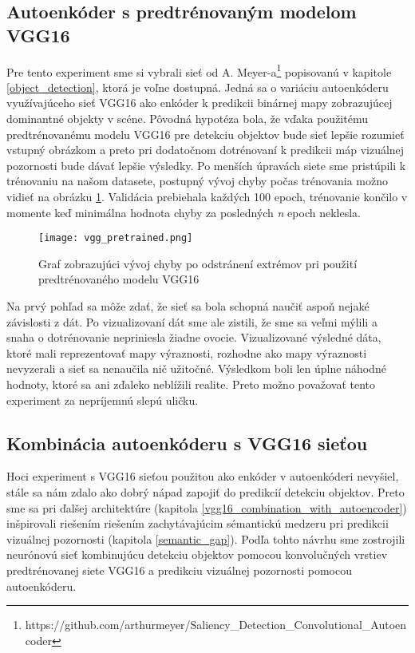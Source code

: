 \subsection{Autoenkóder s predtrénovaným modelom VGG16}
\label{experiments_vgg_net}

Pre tento experiment sme si vybrali sieť od A. Meyer-a\footnote{https://github.com/arthurmeyer/Saliency\_Detection\_Convolutional\_Autoencoder} popisovanú v kapitole \ref{object_detection}, ktorá je voľne dostupná. Jedná sa o variáciu autoenkóderu využívajúceho sieť VGG16 ako enkóder k predikcii binárnej mapy zobrazujúcej dominantné objekty v scéne. Pôvodná hypotéza bola, že vďaka použitému predtrénovanému modelu VGG16 pre detekciu objektov bude sieť lepšie rozumieť vstupný obrázkom a preto pri dodatočnom dotrénovaní k predikcii máp vizuálnej pozornosti bude dávať lepšie výsledky. Po menších úpravách siete sme pristúpili k trénovaniu na našom datasete, postupný vývoj chyby počas trénovania možno vidieť na obrázku \ref{vgg_pretrained_loss}. Validácia prebiehala každých 100 epoch, trénovanie končilo v momente keď minimálna hodnota chyby za posledných \textit{n} epoch neklesla. 
 
\begin{figure}[H]
	\begin{center}
		\texttt{[image: vgg\_pretrained.png]}
		\caption[Vývoj chyby počas trénovanie siete s predtrénovaným modelom VGG16]{
			Graf zobrazujúci vývoj chyby po odstránení extrémov pri použití predtrénovaného modelu VGG16 
		}\label{vgg_pretrained_loss}
	\end{center}
\end{figure}

Na prvý pohľad sa môže zdať, že sieť sa bola schopná naučiť aspoň nejaké závislosti z dát. Po vizualizovaní dát sme ale zistili, že sme sa veľmi mýlili a snaha o dotrénovanie nepriniesla žiadne ovocie. Vizualizované výsledné dáta, ktoré mali reprezentovať mapy výraznosti, rozhodne ako mapy výraznosti nevyzerali a sieť sa nenaučila nič užitočné. Výsledkom boli len úplne náhodné hodnoty, ktoré sa ani zďaleko neblížili realite. Preto možno považovať tento experiment za nepríjemnú slepú uličku.

\subsection{Kombinácia autoenkóderu s VGG16 sieťou}
\label{vgg_autoencoder_experiments}

Hoci experiment s VGG16 sieťou použitou ako enkóder v autoenkóderi nevyšiel, stále sa nám zdalo ako dobrý nápad zapojiť do predikcií detekciu objektov. Preto sme sa pri ďalšej architektúre (kapitola \ref{vgg16_combination_with_autoencoder}) inšpirovali riešením riešením  zachytávajúcim sémantickú medzeru pri predikcii vizuálnej pozornosti (kapitola \ref{semantic_gap}). Podľa tohto návrhu sme zostrojili neurónovú sieť kombinujúcu detekciu objektov pomocou konvolučných vrstiev predtrénovanej siete VGG16 a predikciu vizuálnej pozornosti pomocou autoenkóderu. 

